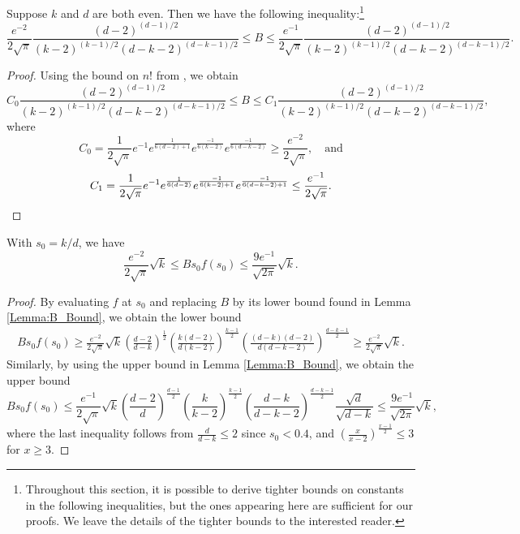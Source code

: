 \documentclass[twoside,11pt]{article}
\begin{document}
\begin{lemma} \label{Lemma:B_Bound} 	Suppose $k$ and $d$ are both even. Then we have the following inequality:\footnote{Throughout this section, it is possible to derive tighter bounds on constants in the following inequalities, but the ones appearing here are sufficient for our proofs.  We leave the details of the tighter bounds to the interested reader.}
\[\frac{e^{-2}}{2\sqrt{\pi}} \frac{\left(d-2\right)^{(d-1)/2}}{ \left(k-2 \right)^{(k-1)/2}\left(d-k-2\right)^{(d-k-1)/2}} \leq B \leq \frac{e^{-1}}{2\sqrt{\pi}}  
		 \frac{\left(d-2\right)^{(d-1)/2}} {\left(k-2 \right)^{(k-1)/2}\left(d-k-2\right)^{(d-k-1)/2}}. \]
\end{lemma}			 			
\begin{proof}
				Using the bound on $n!$ from \cite{Robbins}, we obtain
				\[C_0 \frac{\left(d-2\right)^{(d-1)/2}}{ \left(k-2 \right)^{(k-1)/2}\left(d-k-2\right)^{(d-k-1)/2}} \leq B \leq C_1 \frac{\left(d-2\right)^{(d-1)/2}} {\left(k-2 
				\right)^{(k-1)/2}\left(d-k-2\right)^{(d-k-1)/2}}, \]
				where 
					\[C_0 = \frac{1}{2\sqrt{\pi}}e^{-1}e^{\frac{1}{6(d-2)+1}}e^{\frac{-1}{6(k-2)}}e^{\frac{-1}{6(d-k-2)}} \geq \frac{e^{-2}}{2\sqrt{\pi}}, \quad 
					\text{and}\]
					\[C_1 = \frac{1}{2\sqrt{\pi}}e^{-1}e^{\frac{1}{6(d-2)}}e^{\frac{-1}{6(k-2)+1}}e^{\frac{-1}{6(d-k-2)+1}} \leq \frac{e^{-1}}{2\sqrt{\pi}}.\vspace{-.25in}\]
				\end{proof}
				
			\begin{corollary} \label{Corollary:Bsf_Bound}
				With $s_0 = k/d$, we have
					\[\frac{e^{-2}}{2\sqrt{\pi}}  \sqrt{k} \leq Bs_0f(s_0) \leq \frac{9e^{-1}}{\sqrt{2\pi}} \sqrt{k}.\]
				\end{corollary} 
				\begin{proof}
					By evaluating $f$ at $s_0$ and replacing $B$ by its lower bound found in Lemma \ref{Lemma:B_Bound}, we obtain the lower bound
					\begin{align*}
					Bs_0f(s_0) \geq  \frac{e^{-2}}{2\sqrt{\pi}} \sqrt{k} \left(\frac{d-2}{d-k}\right)^{\frac{1}{2}} \left( \frac{k(d-2)}{d(k-2)} \right)^{\frac{k-1}{2}} \left( \frac{(d-k)(d-2)}{d(d-
					k-2)} \right)^{\frac{d-k-1}{2}}\geq  \frac{e^{-2}}{2\sqrt{\pi}} \sqrt{k} .
					\end{align*}
					Similarly, by using the upper bound in Lemma \ref{Lemma:B_Bound}, we obtain the upper bound
						$$
						Bs_0f(s_0) \leq \frac{e^{-1}}{2\sqrt{\pi}} \sqrt{k} \left(\frac{d-2}{d}\right)^{\frac{d-1}{2}} \left(\frac{k}{k-2}\right)^{\frac{k-1}{2}} \left( \frac{d-
						k}{d-k-2} \right)^{\frac{d-k-1}{2}} \frac{\sqrt{d}}{\sqrt{d-k}}
										\leq \frac{9e^{-1}}{\sqrt{2\pi}}  \sqrt{k},
						$$
				where the last inequality follows from $\frac{d}{d-k} \leq 2$ since $s_0<0.4$, and $\left(\frac{x}{x-2}\right)^{\frac{x-1}{2}} \leq 3$ for $x \geq 3$. 		
				\end{proof}
					
\end{document}
